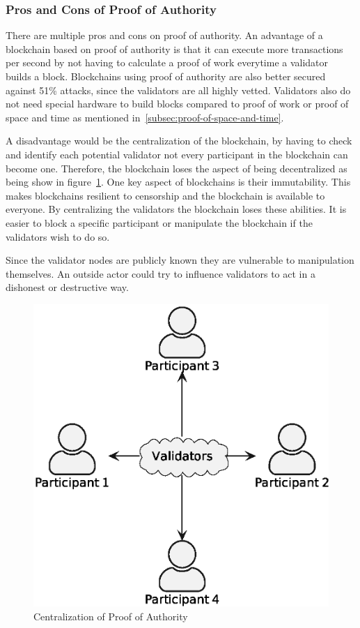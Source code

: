 \subsubsection{Pros and Cons of Proof of Authority}
There are multiple pros and cons on proof of authority.
An advantage of a blockchain based on proof of authority is that it can execute more transactions per second by not having to calculate a proof of work everytime a validator builds a block.
Blockchains using proof of authority are also better secured against 51\% attacks, since the validators are all highly vetted.
Validators also do not need special hardware to build blocks compared to proof of work or proof of space and time as mentioned in\ \ref{subsec:proof-of-space-and-time}.

A disadvantage would be the centralization of the blockchain, by having to check and identify each potential validator not every participant in the blockchain can become one.
Therefore, the blockchain loses the aspect of being decentralized as being show in figure\ \ref{fig:centralization-of-proof-of-authority}.
One key aspect of blockchains is their immutability.
This makes blockchains resilient to censorship and the blockchain is available to everyone.
By centralizing the validators the blockchain loses these abilities.
It is easier to block a specific participant  or manipulate the blockchain if the validators wish to do so.

Since the validator nodes are publicly known they are vulnerable to manipulation themselves.
An outside actor could try to influence validators to act in a dishonest or destructive way.\cite{insidecrypto-poa,coindesk-poa}

\begin{figure}[h]
    \centering
    \includegraphics[scale=0.5]{img/proof-of-authority-0}
    \caption{Centralization of Proof of Authority}
    \label{fig:centralization-of-proof-of-authority}
\end{figure}

